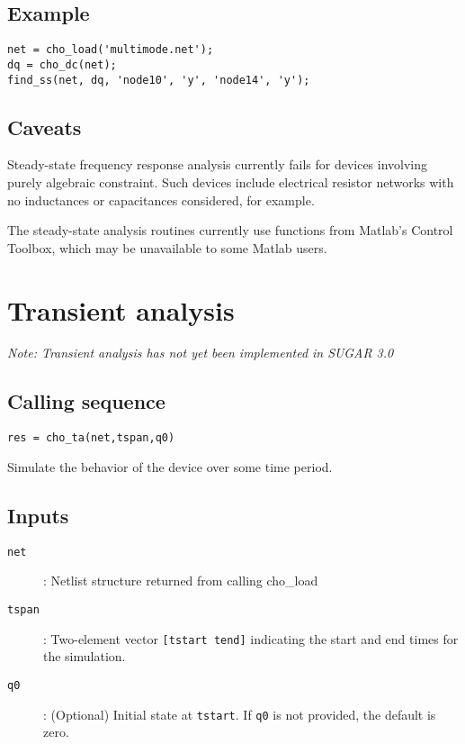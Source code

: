 \subsection*{Example}

\begin{verbatim}
net = cho_load('multimode.net'); 
dq = cho_dc(net);
find_ss(net, dq, 'node10', 'y', 'node14', 'y');
\end{verbatim}

\subsection*{Caveats}

Steady-state frequency response analysis currently fails for devices
involving purely algebraic constraint.  Such devices include electrical
resistor networks with no inductances or capacitances considered,
for example.

The steady-state analysis routines currently use functions from Matlab's
Control Toolbox, which may be unavailable to some Matlab users.


\section{Transient analysis}

\emph{Note: Transient analysis has not yet been implemented in SUGAR 3.0}

\subsection*{Calling sequence}

\begin{verbatim}
res = cho_ta(net,tspan,q0)
\end{verbatim}

Simulate the behavior of the device over some time period.

\subsection*{Inputs}

\begin{description}
\item[\texttt{net}]: 
  Netlist structure returned from calling cho\_load
\item[\texttt{tspan}]: 
  Two-element vector \texttt{[tstart tend]} indicating the start
  and end times for the simulation.
\item[\texttt{q0}]: 
  (Optional) Initial state at \texttt{tstart}.
  If \texttt{q0} is not provided, the default is zero.
\end{description}

